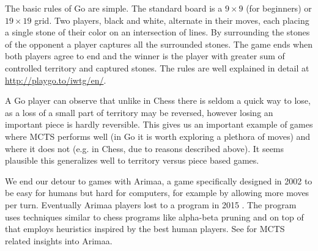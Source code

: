 The basic rules of Go are simple. The
standard board is a $9\times9$ (for beginners) or $19 \times 19$ grid.
Two players, black and white, alternate in their moves, each
placing a single stone of their color on an intersection of lines.
By surrounding the stones of the opponent a player captures all the
surrounded stones. The game ends when both players agree to end and the
winner is the player with greater sum of controlled territory and
captured stones.
The rules are well explained in detail at
\href{http://playgo.to/iwtg/en/}{http://playgo.to/iwtg/en/}.

A Go player can observe that unlike in Chess there is seldom a quick way
to lose, as a loss of a small part of territory may be reversed, however
losing an important piece is hardly reversible.
This gives us an important example of games where MCTS performs well (in
Go it is worth exploring a plethora of moves) and where it does not
(e.g. in Chess, due to reasons described above).
It seems plausible this
generalizes well to territory versus piece based games.

We end our detour to games with Arimaa, a game specifically designed in
2002 to be easy for humans but hard for computers, for example by
allowing more moves per turn. Eventually Arimaa players lost to a
program in 2015 \parencite{arimaa}. The program uses techniques similar
to chess programs like alpha-beta pruning and on top of that employs
heuristics inspired by the best human players. See \parencite{jakl} for
MCTS related insights into Arimaa.
